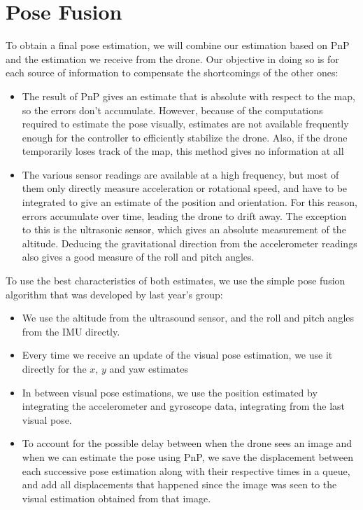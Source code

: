 \section{Pose Fusion}\label{sec:posefusion}
To obtain a final pose estimation, we will combine our estimation based on PnP and the estimation we receive from the drone. Our objective in doing so is for each source of information to compensate the shortcomings of the other ones:
\begin{itemize}
\item The result of PnP gives an estimate that is absolute with respect to the map, so the errors don't accumulate. However, because of the computations required to estimate the pose visually, estimates are not available frequently enough for the controller to efficiently stabilize the drone. Also, if the drone temporarily loses track of the map, this method gives no information at all
\item The various sensor readings are available at a high frequency, but most of them only directly measure acceleration or rotational speed, and have to be integrated to give an estimate of the position and orientation. For this reason, errors accumulate over time, leading the drone to drift away. The exception to this is the ultrasonic sensor, which gives an absolute measurement of the altitude. Deducing the gravitational direction from the accelerometer readings also gives a good measure of the roll and pitch angles.
\end{itemize}
To use the best characteristics of both estimates, we use the simple pose fusion algorithm that was developed by last year's group:
\begin{itemize}
\item We use the altitude from the ultrasound sensor, and the roll and pitch angles from the IMU directly.
\item Every time we receive an update of the visual pose estimation, we use it directly for the $x$, $y$ and yaw estimates
\item In between visual pose estimations, we use the position estimated by integrating the accelerometer and gyroscope data, integrating from the last visual pose.
\item To account for the possible delay between when the drone sees an image and when we can estimate the pose using PnP, we save the displacement between each successive pose estimation along with their respective times in a queue, and add all displacements that happened since the image was seen to the visual estimation obtained from that image.
\end{itemize}

